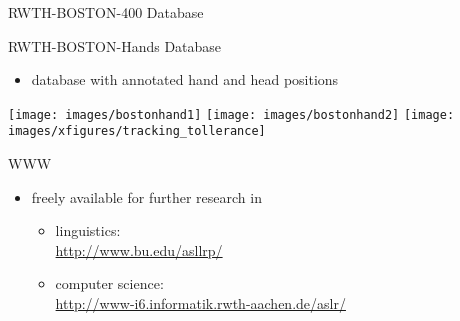 \documentclass[final]{beamer}
\begin{document}
\begin{frame}{}
\begin{columns}[t]
\begin{column}{.45\linewidth}
\begin{block}{RWTH-BOSTON-400 Database}
      
    \end{block}
    
    \begin{block}{RWTH-BOSTON-Hands Database}
      \begin{itemize}
      \item database with annotated hand and head positions
      \end{itemize}
      
      \texttt{[image: images/bostonhand1]} \hspace{1ex}
      \texttt{[image: images/bostonhand2]}  \hspace{1ex}
      \texttt{[image: images/xfigures/tracking\_tollerance]}
      
    \end{block}

    \begin{block}{WWW}
      \begin{itemize}
      \item freely available for further research in
        \begin{itemize}
        \item linguistics:\\
          {\large \url{http://www.bu.edu/asllrp/}}
        \item computer science:\\
          {\large \url{http://www-i6.informatik.rwth-aachen.de/aslr/}}
        \end{itemize}
      \end{itemize}
    \end{block}
       
  \end{column}
\end{columns}
\vfill
\end{frame}
\end{document}
